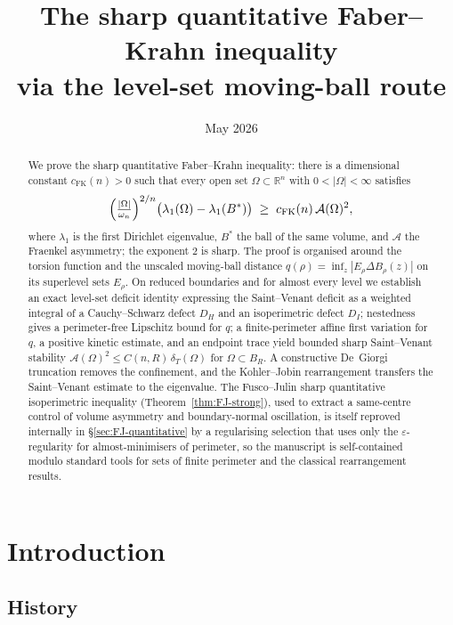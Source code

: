 \documentclass[11pt]{amsart}
\title[Sharp quantitative Faber--Krahn stability]
{The sharp quantitative Faber--Krahn inequality\\
via the level-set moving-ball route}
\author{}
\date{May 2026}
\theoremstyle{definition}
\newcommand{\R}{\mathbb R}
\newcommand{\Om}{\Omega}
\newcommand{\Fr}{\mathcal A}
\newcommand{\dT}{\delta_T}
\newcommand{\eps}{\varepsilon}
\newcommand{\Bstar}{B^*}
\begin{document}
\begin{abstract}
We prove the sharp quantitative Faber--Krahn inequality: there is a dimensional
constant \(c_{\mathrm{FK}}(n)>0\) such that every open set \(\Om\subset\R^n\)
with \(0<|\Om|<\infty\) satisfies
\[
   \Bigl(\tfrac{|\Om|}{\omega_n}\Bigr)^{2/n}
   \bigl(\lambda_1(\Om)-\lambda_1(\Bstar)\bigr)
   \;\ge\; c_{\mathrm{FK}}(n)\,\Fr(\Om)^2 ,
\]
where \(\lambda_1\) is the first Dirichlet eigenvalue, \(\Bstar\) the ball of
the same volume, and \(\Fr\) the Fraenkel asymmetry; the exponent \(2\) is
sharp.  The proof is organised around the torsion function and the unscaled
moving-ball distance \(q(\rho)=\inf_{z}|E_\rho\Delta B_\rho(z)|\) on its
superlevel sets \(E_\rho\).  On reduced boundaries and for almost every level we
establish an exact level-set deficit identity expressing the Saint--Venant
deficit as a weighted integral of a Cauchy--Schwarz defect \(D_H\) and an
isoperimetric defect \(D_I\); nestedness gives a perimeter-free Lipschitz bound
for \(q\); a finite-perimeter affine first variation for \(q\), a positive
kinetic estimate, and an endpoint trace yield bounded sharp Saint--Venant
stability \(\Fr(\Om)^2\le C(n,R)\,\dT(\Om)\) for \(\Om\subset B_R\).  A
constructive De~Giorgi truncation removes the confinement, and the
Kohler--Jobin rearrangement transfers the Saint--Venant estimate to the
eigenvalue.  The Fusco--Julin sharp quantitative isoperimetric inequality
(Theorem~\ref{thm:FJ-strong}), used to extract a same-centre control of
volume asymmetry and boundary-normal oscillation, is itself reproved
internally in \S\ref{sec:FJ-quantitative} by a regularising selection
that uses only the \(\eps\)-regularity for almost-minimisers of
perimeter, so the manuscript is self-contained modulo standard tools for
sets of finite perimeter and the classical rearrangement results.
\end{abstract}

\maketitle
\tableofcontents

\section{Introduction}\label{sec:intro}

\subsection{History}\label{sec:intro-history}
\end{document}
